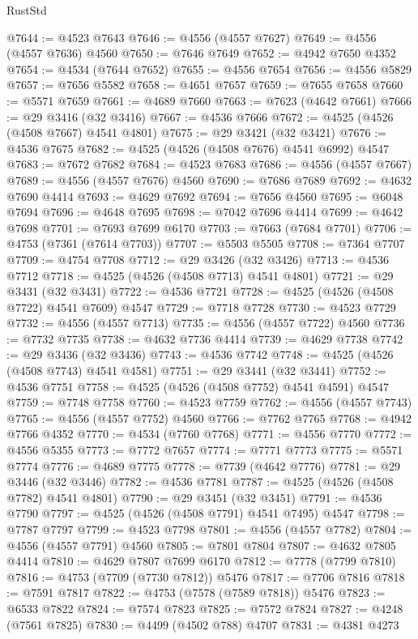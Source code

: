 \begin{lexlean}{RustStd}
\begin{coremodule}
{\begin{coremodule}
{{{{{{{{{{{{{{{{{{{{{{{{{{{{{{{{{{{{{{{{{{{{{{{{{{{{{{{@7644 := @4523 @7643
@7646 := @4556 (@4557 @7627)
@7649 := @4556 (@4557 @7636) @4560
@7650 := @7646 @7649
@7652 := @4942 @7650 @4352
@7654 := @4534 (@7644 @7652)
@7655 := @4556 @7654
@7656 := @4556 @5829
@7657 := @7656 @5582
@7658 := @4651 @7657
@7659 := @7655 @7658
@7660 := @5571 @7659
@7661 := @4689 @7660
@7663 := @7623 (@4642 @7661)
@7666 := @29 @3416 (@32 @3416)
@7667 := @4536 @7666
@7672 := @4525 (@4526 (@4508 @7667) @4541 @4801)
@7675 := @29 @3421 (@32 @3421)
@7676 := @4536 @7675
@7682 := @4525 (@4526 (@4508 @7676) @4541 @6992) @4547
@7683 := @7672 @7682
@7684 := @4523 @7683
@7686 := @4556 (@4557 @7667)
@7689 := @4556 (@4557 @7676) @4560
@7690 := @7686 @7689
@7692 := @4632 @7690 @4414
@7693 := @4629 @7692
@7694 := @7656 @4560
@7695 := @6048 @7694
@7696 := @4648 @7695
@7698 := @7042 @7696 @4414
@7699 := @4642 @7698
@7701 := @7693 @7699 @6170
@7703 := @7663 (@7684 @7701)
@7706 := @4753 (@7361 (@7614 @7703))
@7707 := @5503 @5505
@7708 := @7364 @7707
@7709 := @4754 @7708
@7712 := @29 @3426 (@32 @3426)
@7713 := @4536 @7712
@7718 := @4525 (@4526 (@4508 @7713) @4541 @4801)
@7721 := @29 @3431 (@32 @3431)
@7722 := @4536 @7721
@7728 := @4525 (@4526 (@4508 @7722) @4541 @7609) @4547
@7729 := @7718 @7728
@7730 := @4523 @7729
@7732 := @4556 (@4557 @7713)
@7735 := @4556 (@4557 @7722) @4560
@7736 := @7732 @7735
@7738 := @4632 @7736 @4414
@7739 := @4629 @7738
@7742 := @29 @3436 (@32 @3436)
@7743 := @4536 @7742
@7748 := @4525 (@4526 (@4508 @7743) @4541 @4581)
@7751 := @29 @3441 (@32 @3441)
@7752 := @4536 @7751
@7758 := @4525 (@4526 (@4508 @7752) @4541 @4591) @4547
@7759 := @7748 @7758
@7760 := @4523 @7759
@7762 := @4556 (@4557 @7743)
@7765 := @4556 (@4557 @7752) @4560
@7766 := @7762 @7765
@7768 := @4942 @7766 @4352
@7770 := @4534 (@7760 @7768)
@7771 := @4556 @7770
@7772 := @4556 @5355
@7773 := @7772 @7657
@7774 := @7771 @7773
@7775 := @5571 @7774
@7776 := @4689 @7775
@7778 := @7739 (@4642 @7776)
@7781 := @29 @3446 (@32 @3446)
@7782 := @4536 @7781
@7787 := @4525 (@4526 (@4508 @7782) @4541 @4801)
@7790 := @29 @3451 (@32 @3451)
@7791 := @4536 @7790
@7797 := @4525 (@4526 (@4508 @7791) @4541 @7495) @4547
@7798 := @7787 @7797
@7799 := @4523 @7798
@7801 := @4556 (@4557 @7782)
@7804 := @4556 (@4557 @7791) @4560
@7805 := @7801 @7804
@7807 := @4632 @7805 @4414
@7810 := @4629 @7807 @7699 @6170
@7812 := @7778 (@7799 @7810)
@7816 := @4753 (@7709 (@7730 @7812)) @5476
@7817 := @7706 @7816
@7818 := @7591 @7817
@7822 := @4753 (@7578 (@7589 @7818)) @5476
@7823 := @6533 @7822
@7824 := @7574 @7823
@7825 := @7572 @7824
@7827 := @4248 (@7561 @7825)
@7830 := @4499 (@4502 @788) @4707
@7831 := @4381 @4273
}}}}}}}}}}}}}}}}}}}}}}}}}}}}}}}}}}}}}}}}}}}}}}}}}}}}}}}
\end{coremodule}}
\end{coremodule}
\end{lexlean}
